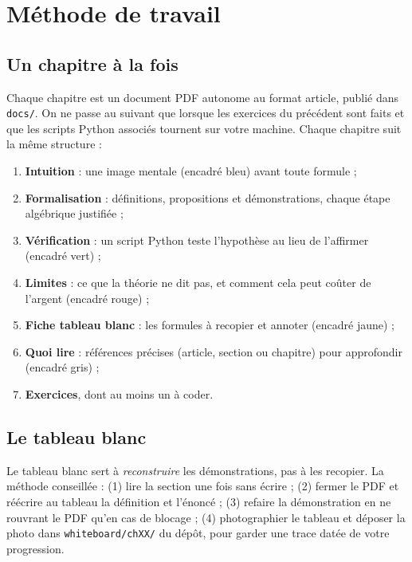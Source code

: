 \documentclass[11pt,a4paper]{article}
\begin{document}
\section{Méthode de travail}

\subsection{Un chapitre à la fois}
Chaque chapitre est un document PDF autonome au format article, publié dans \texttt{docs/}. On ne passe au suivant que lorsque les exercices du précédent sont faits et que les scripts Python associés tournent sur votre machine. Chaque chapitre suit la même structure :
\begin{enumerate}
\item \textbf{Intuition} : une image mentale (encadré bleu) avant toute formule ;
\item \textbf{Formalisation} : définitions, propositions et démonstrations, chaque étape algébrique justifiée ;
\item \textbf{Vérification} : un script Python teste l'hypothèse au lieu de l'affirmer (encadré vert) ;
\item \textbf{Limites} : ce que la théorie ne dit pas, et comment cela peut coûter de l'argent (encadré rouge) ;
\item \textbf{Fiche tableau blanc} : les formules à recopier et annoter (encadré jaune) ;
\item \textbf{Quoi lire} : références précises (article, section ou chapitre) pour approfondir (encadré gris) ;
\item \textbf{Exercices}, dont au moins un à coder.
\end{enumerate}

\subsection{Le tableau blanc}
Le tableau blanc sert à \emph{reconstruire} les démonstrations, pas à les recopier. La méthode conseillée : (1) lire la section une fois sans écrire ; (2) fermer le PDF et réécrire au tableau la définition et l'énoncé ; (3) refaire la démonstration en ne rouvrant le PDF qu'en cas de blocage ; (4) photographier le tableau et déposer la photo dans \texttt{whiteboard/chXX/} du dépôt, pour garder une trace datée de votre progression.
\end{document}
